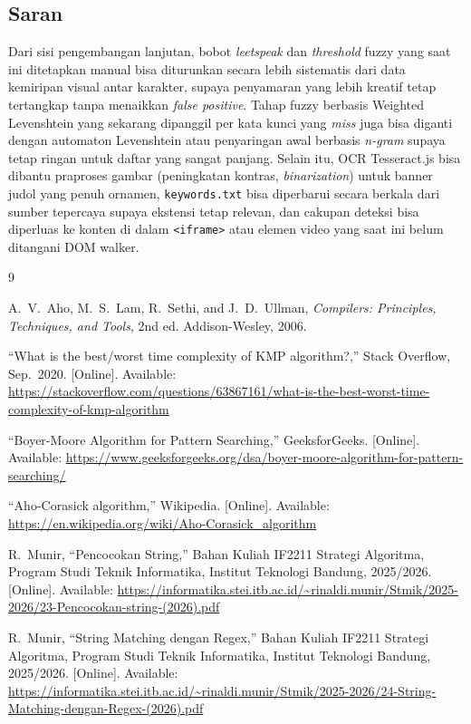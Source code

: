 \documentclass[11pt,a4paper]{article}
\begin{document}
\subsection{Saran}

Dari sisi pengembangan lanjutan, bobot \textit{leetspeak} dan \textit{threshold} fuzzy yang saat ini ditetapkan manual bisa
diturunkan secara lebih sistematis dari data kemiripan visual antar karakter, supaya penyamaran yang lebih kreatif tetap
tertangkap tanpa menaikkan \textit{false positive}. Tahap fuzzy berbasis Weighted Levenshtein yang sekarang dipanggil per kata
kunci yang \textit{miss} juga bisa diganti dengan automaton Levenshtein atau penyaringan awal berbasis \textit{n-gram} supaya
tetap ringan untuk daftar yang sangat panjang. Selain itu, OCR Tesseract.js bisa dibantu praproses gambar (peningkatan kontras,
\textit{binarization}) untuk banner judol yang penuh ornamen, \texttt{keywords.txt} bisa diperbarui secara berkala dari sumber
tepercaya supaya ekstensi tetap relevan, dan cakupan deteksi bisa diperluas ke konten di dalam \texttt{<iframe>} atau elemen
video yang saat ini belum ditangani DOM walker.

\newpage
\begin{thebibliography}{9}

A.~V.~Aho, M.~S.~Lam, R.~Sethi, and J.~D.~Ullman,
\textit{Compilers: Principles, Techniques, and Tools}, 2nd ed.
Addison-Wesley, 2006.

``What is the best/worst time complexity of KMP algorithm?,''
Stack Overflow, Sep.~2020. [Online]. Available:
\url{https://stackoverflow.com/questions/63867161/what-is-the-best-worst-time-complexity-of-kmp-algorithm}

``Boyer-Moore Algorithm for Pattern Searching,''
GeeksforGeeks. [Online]. Available:
\url{https://www.geeksforgeeks.org/dsa/boyer-moore-algorithm-for-pattern-searching/}

``Aho-Corasick algorithm,''
Wikipedia. [Online]. Available:
\url{https://en.wikipedia.org/wiki/Aho-Corasick_algorithm}

R.~Munir, ``Pencocokan String,'' Bahan Kuliah IF2211 Strategi Algoritma, Program Studi Teknik Informatika, Institut Teknologi
Bandung, 2025/2026. [Online]. Available:
\url{https://informatika.stei.itb.ac.id/~rinaldi.munir/Stmik/2025-2026/23-Pencocokan-string-(2026).pdf}

R.~Munir, ``String Matching dengan Regex,'' Bahan Kuliah IF2211 Strategi Algoritma, Program Studi Teknik Informatika, Institut
Teknologi Bandung, 2025/2026. [Online]. Available:
\url{https://informatika.stei.itb.ac.id/~rinaldi.munir/Stmik/2025-2026/24-String-Matching-dengan-Regex-(2026).pdf}

\end{thebibliography}
\end{document}
